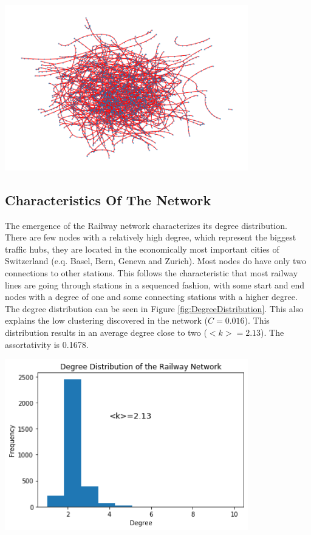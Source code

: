 \documentclass{Resources/netsci-project}
\begin{document}
\begin{center}
    \centering
    \includegraphics[width=300pt]{Resources/Network_cleaned_on_map}
    \label{fig:NetworkCleanedOnMap}
\end{center}


\subsection{Characteristics Of The Network}
The emergence of the Railway network characterizes its degree distribution. There are few nodes with a relatively high degree, which represent the biggest traffic hubs, they are located in the economically most important cities of Switzerland (e.q. Basel, Bern, Geneva and Zurich). Most nodes do have only two connections to other stations. This follows the characteristic that most railway lines are going through stations in a sequenced fashion, with some start and end nodes with a degree of one and some connecting stations with a higher degree. The degree distribution can be seen in Figure \ref{fig:DegreeDistribution}. This also explains the low clustering discovered in the network ($ C = 0.016 $). This distribution results in an average degree close to two ($ <k> = 2.13 $). The assortativity is 0.1678.

\begin{center}
    \centering
    \includegraphics[width=300pt]{Resources/degree_distribution}
    \label{fig:DegreeDistribution}
\end{center}
\end{document}
